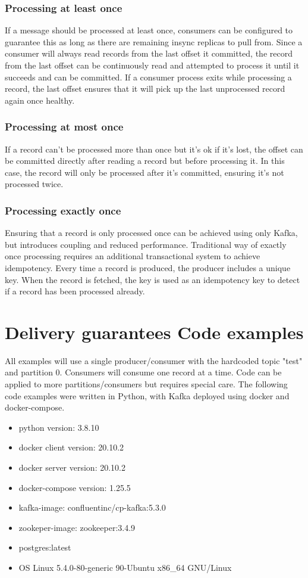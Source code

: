 \documentclass[11pt]{article}
\begin{document}
\subsubsection{Processing at least once}
If a message should be processed at least once, consumers can be configured to guarantee this as long as there are remaining insync replicas to pull from. Since a consumer will always read records from the last offset it committed, the record from the last offset can be continuously read and attempted to process it until it succeeds and can be committed. If a consumer process exits while processing a record, the last offset ensures that it will pick up the last unprocessed record again once healthy.

\subsubsection{Processing at most once}
If a record can't be processed more than once but it's ok if it's lost, the offset can be committed directly after reading a record but before processing it. In this case, the record will only be processed after it's committed, ensuring it's not processed twice.

\subsubsection{Processing exactly once}
Ensuring that a record is only processed once can be achieved using only Kafka, but introduces coupling and reduced performance. Traditional way of exactly once processing requires an additional transactional system to achieve idempotency. Every time a record is produced, the producer includes a unique key. When the record is fetched, the key is used as an idempotency key to detect if a record has been processed already. 

\clearpage
\section{Delivery guarantees Code examples}

All examples will use a single producer/consumer with the hardcoded topic "test" and partition 0.
Consumers will consume one record at a time. Code can be applied to more partitions/consumers but requires special care. The following code examples were written in Python, with Kafka deployed using docker and docker-compose.

\begin{itemize}
	\item python version: 3.8.10
	\item docker client version: 20.10.2
	\item docker server version: 20.10.2
	\item docker-compose version: 1.25.5
	\item kafka-image: confluentinc/cp-kafka:5.3.0
	\item zookeper-image: zookeeper:3.4.9
	\item postgres:latest
	\item{OS Linux 5.4.0-80-generic 90-Ubuntu x86\_64 GNU/Linux}
\end{itemize}
\end{document}
